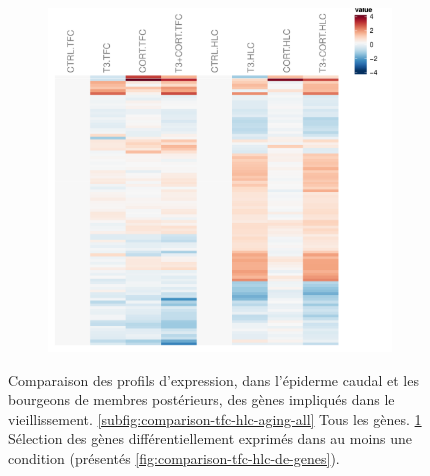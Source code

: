 \begin{figure}[!htbp]
\begin{subfigure}{0.49\textwidth}
	\includegraphics[width=\textwidth]
	{Figures/comparison-tfc-hlc-aging/comparison-tfc-hlc-aging-de.pdf}
	\caption{}
	\label{subfig:comparison-tfc-hlc-aging-de}
\end{subfigure}
\caption[Profils d'expression des gènes impliqués dans le vieillissement]
{
Comparaison des profils d'expression, dans l'épiderme caudal et les bourgeons de membres postérieurs, des gènes impliqués dans le vieillissement.
\ref{subfig:comparison-tfc-hlc-aging-all} Tous les gènes.
\ref{subfig:comparison-tfc-hlc-aging-de} Sélection des gènes différentiellement exprimés dans au moins une condition (présentés \autoref{fig:comparison-tfc-hlc-de-genes}).
}
\label{fig:comparison-tfc-hlc-aging}
%
\end{figure}
%
